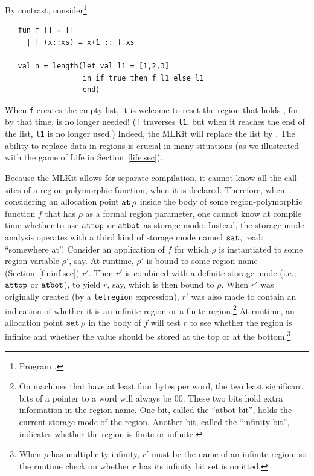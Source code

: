 \documentclass[12pt]{book}
\begin{document}
By contrast, consider\footnote{Program .}
\begin{verbatim}
   fun f [] = []
     | f (x::xs) = x+1 :: f xs

   val n = length(let val l1 = [1,2,3]
                  in if true then f l1 else l1
                  end)
\end{verbatim}
When {\tt f} creates the empty list, it is welcome to reset the region
that holds , for by that time,  is no longer
needed! ({\tt f} traverses {\tt l1}, but when it reaches the end of
the list, {\tt l1} is no longer used.)  Indeed, the MLKit will replace
the list \boxml{[1,2,3]} by \boxml{[2,3,4]}. The ability to replace
data in regions is crucial in many situations (as we illustrated with
the game of Life in Section~\ref{life.sec}).

Because the MLKit allows for separate compilation, it cannot know all
the call sites of a region-polymorphic function, when it is declared.
Therefore, when considering an allocation point $\mathbin{\hbox{\tt at}}\,\rho$ inside the
body of some region-polymorphic function $f$ that has $\rho$ as a
formal region parameter, one cannot know at compile time whether to
use $\hbox{\tt attop}$ or $\hbox{\tt atbot}$ as storage mode.  Instead, the storage mode
analysis operates with a third kind of storage mode named $\hbox{\tt sat}$,
read: ``somewhere at''. Consider an application of $f$ for which
$\rho$ is instantiated to some region variable $\rho'$, say. At
runtime, $\rho'$ is bound to some region name
(Section~\ref{fininf.sec}) $r'$.  Then $r'$ is combined with a
definite storage mode (i.e., $\hbox{\tt attop}$ or $\hbox{\tt atbot}$), to yield $r$, say,
which is then bound to $\rho$.  When $r'$ was originally created (by a
{\tt letregion} expression), $r'$ was also made to contain an
indication of whether it is an infinite region or a finite
region.\footnote{On machines\label{atbit.lab} that have at least four
  bytes per word, the two least significant bits of a pointer to a
  word will always be 00. These two bits hold extra information in the
  region name.  One bit, called the ``atbot bit'', holds the current
  storage mode of the region. Another bit, called the ``infinity
  bit'', indicates whether the region is finite or infinite.}  At
runtime, an allocation point $\hbox{\tt sat}\,\rho$ in the body of $f$ will test
$r$ to see whether the region is infinite and whether the value should
be stored at the top or at the bottom.\footnote{When $\rho$ has
  multiplicity infinity, $r'$ must be the name of an infinite region,
  so the runtime check on whether $r$ has its infinity bit set is
  omitted.}
\end{document}
